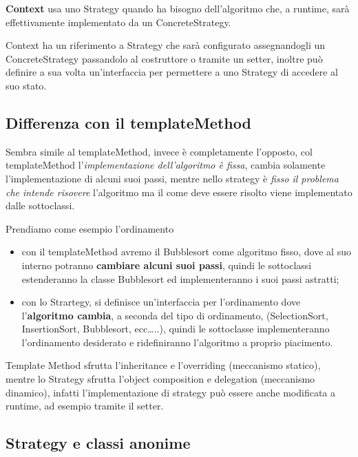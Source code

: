 \textbf{Context} usa uno Strategy quando ha bisogno dell’algoritmo che, a runtime, sarà effettivamente implementato da un ConcreteStrategy.

Context ha un riferimento a Strategy che sarà configurato assegnandogli un ConcreteStrategy passandolo al costruttore o tramite un setter, inoltre può definire a sua 
volta un’interfaccia per permettere a uno Strategy di accedere al suo stato.

\subsection{Differenza con il templateMethod}

Sembra simile al templateMethod, invece è completamente l'opposto, col templateMethod l'\textit{implementazione dell'algoritmo è fissa}, cambia solamente 
l'implementazione di alcuni suoi passi, mentre nello strategy è \textit{fisso il problema che intende risovere} l'algoritmo ma il come deve essere risolto viene 
implementato dalle sottoclassi. 
\smallskip

Prendiamo come esempio l'ordinamento

\begin{itemize}
    \item con il templateMethod avremo il Bubblesort come algoritmo fisso, dove al suo interno potranno \textbf{cambiare alcuni suoi passi}, quindi le sottoclassi
    estenderanno la classe Bubblesort ed implementeranno i suoi passi astratti;
    \item con lo Strartegy, si definisce un'interfaccia per l'ordinamento dove l'\textbf{algoritmo cambia}, a seconda del tipo di ordinamento,  
    (SelectionSort, InsertionSort, Bubblesort, ecc\dots..), quindi le sottoclasse implementeranno l'ordinamento desiderato e ridefiniranno l'algoritmo a proprio 
    piacimento.
\end{itemize}

Template Method sfrutta l’inheritance e l’overriding (meccanismo statico), mentre lo Strategy sfrutta l’object composition e delegation (meccanismo dinamico), 
infatti l’implementazione di strategy può essere anche modificata a runtime, ad esempio tramite il setter.

\subsection{Strategy e classi anonime}

